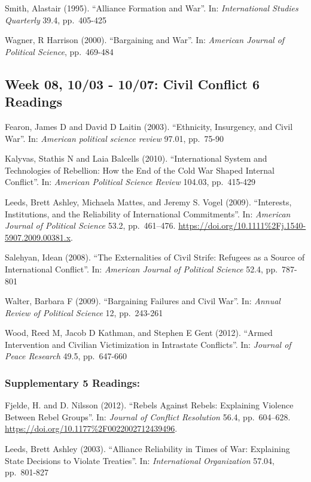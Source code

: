 \documentclass[10pt,]{article}
\begin{document}
Smith, Alastair (1995). ``Alliance Formation and War''. In:
\emph{International Studies Quarterly} 39.4, pp.~405-425

Wagner, R Harrison (2000). ``Bargaining and War''. In:
\emph{American Journal of Political Science}, pp.~469-484

\subsection{Week 08, 10/03 - 10/07: Civil Conflict \textbar{} 6
Readings}\label{week-08-1003---1007-civil-conflict-6-readings}

Fearon, James D and David D Laitin (2003). ``Ethnicity, Insurgency, and
Civil War''. In: \emph{American political science review} 97.01,
pp.~75-90

Kalyvas, Stathis N and Laia Balcells (2010). ``International System and
Technologies of Rebellion: How the End of the Cold War Shaped Internal
Conflict''. In: \emph{American Political Science Review} 104.03,
pp.~415-429

Leeds, Brett Ashley, Michaela Mattes, and Jeremy S. Vogel (2009).
``Interests, Institutions, and the Reliability of International
Commitments''. In: \emph{American Journal of Political Science} 53.2,
pp.~461--476. \url{https://doi.org/10.1111\%2Fj.1540-5907.2009.00381.x}.

Salehyan, Idean (2008). ``The Externalities of Civil Strife: Refugees as
a Source of International Conflict''. In:
\emph{American Journal of Political Science} 52.4, pp.~787-801

Walter, Barbara F (2009). ``Bargaining Failures and Civil War''. In:
\emph{Annual Review of Political Science} 12, pp.~243-261

Wood, Reed M, Jacob D Kathman, and Stephen E Gent (2012). ``Armed
Intervention and Civilian Victimization in Intrastate Conflicts''. In:
\emph{Journal of Peace Research} 49.5, pp.~647-660

\subsubsection{Supplementary \textbar{} 5
Readings:}\label{supplementary-5-readings-2}

Fjelde, H. and D. Nilsson (2012). ``Rebels Against Rebels: Explaining
Violence Between Rebel Groups''. In:
\emph{Journal of Conflict Resolution} 56.4, pp.~604--628.
\url{https://doi.org/10.1177\%2F0022002712439496}.

Leeds, Brett Ashley (2003). ``Alliance Reliability in Times of War:
Explaining State Decisions to Violate Treaties''. In:
\emph{International Organization} 57.04, pp.~801-827
\end{document}
